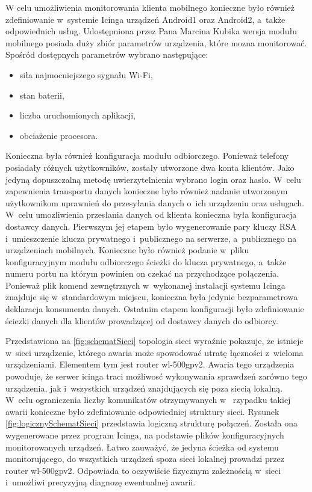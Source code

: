 W celu umożliwienia monitorowania klienta mobilnego konieczne było
również zdefiniowanie w~systemie Icinga urządzeń Android1 oraz
Android2, a~także odpowiednich usług. Udostępniona przez Pana Marcina
Kubika wersja modułu mobilnego posiada duży zbiór parametrów
urządzenia, które mozna monitorować. Spośród dostępnych parametrów
wybrano następujące:

\begin{itemize}
\item siła najmocniejszego sygnału Wi-Fi,
\item stan baterii,
\item liczba uruchomionych aplikacji,
\item obciażenie procesora.
\end{itemize}

Konieczna była również konfiguracja modułu odbiorczego. Ponieważ
telefony posiadały różnych użytkowników, zostały utworzone dwa konta
klientów. Jako jedyną dopuszczalną metodę uwierzytelnienia wybrano
login oraz hasło. W~celu zapewnienia transportu danych konieczne było
również nadanie utworzonym użytkownikom uprawnień do przesyłania
danych o~ich urządzeniu oraz usługach. W~celu umozliwienia przesłania
danych od klienta konieczna była konfiguracja dostawcy
danych. Pierwszym jej etapem było wygenerowanie pary kluczy RSA
i~umieszczenie klucza prywatnego i~publicznego na serwerze,
a~publicznego na urządzeniach mobilnych. Konieczne było również
podanie w~pliku konfiguracyjnym modułu odbiorczego ścieżki do klucza
prywatnego, a~także numeru portu na którym powinien on czekać na
przychodzące połączenia. Ponieważ plik komend zewnętrznych w~wykonanej
instalacji systemu Icinga znajduje się w~standardowym miejscu,
konieczna była jedynie bezparametrowa deklaracja konsumenta
danych. Ostatnim etapem konfiguracji było zdefiniowanie ściezki danych
dla klientów prowadzącej od dostawcy danych do odbiorcy.

Przedstawiona na \ref{fig:schematSieci} topologia sieci wyraźnie
pokazuje, że istnieje w~sieci urządzenie, którego awaria może
spowodować utratę łączności z~wieloma urządzeniami. Elementem tym jest
router wl-500gpv2. Awaria tego urządzenia powoduje, że serwer icinga
traci możliwosć wykonywania sprawdzeń zarówno tego urządzenia, jak
i~wszystkich urządzeń znajdujących się poza siecią lokalną. W~celu
ograniczenia liczby komunikatów otrzymywanych w ~rzypadku takiej
awarii konieczne było zdefiniowanie odpowiedniej struktury
sieci. Rysunek \ref{fig:logicznySchematSieci} przedstawia logiczną
strukturę połączeń. Została ona wygenerowane przez program Icinga, na
podstawie plików konfiguracyjnych monitorowanych urządzeń. Łatwo
zauważyć, że jedyna ścieżka od systemu monitorującego, do wszystkich
urządzeń spoza sieci lokalnej prowadzi przez router
wl-500gpv2. Odpowiada to oczywiście fizycznym zależnością w~sieci
i~umożliwi precyzyjną diagnozę ewentualnej awarii.


